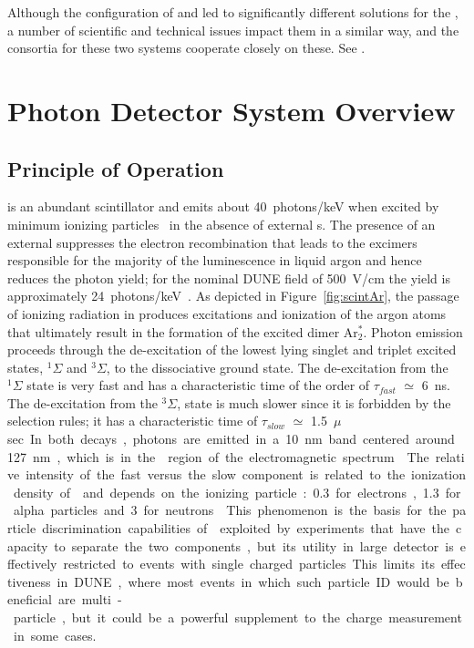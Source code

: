 Although the configuration of \single and \dual {} led to significantly different solutions for the , a number of scientific and technical issues impact them in a similar way, and the consortia for these two systems cooperate closely on these. See \dpchpds.



\section{Photon Detector System Overview}
\label{sec:fdsp-pd-overview}


\subsection{Principle of Operation}
\lar is  an abundant scintillator and emits about \SI{40}{photons/keV} when excited by minimum ionizing particles~\cite{Doke:1990rza} in the absence of external \efield{}s.
The presence of an external \efield{} suppresses the electron recombination that leads to the excimers responsible for the majority of the  luminescence in liquid argon and hence reduces the photon yield; for the nominal DUNE  field of \SI{500}{V/cm} the yield is approximately \SI{24}{photons/keV}~\cite{PhysRevB.20.3486}. 
As depicted in Figure~\ref{fig:scintAr}, the passage of ionizing radiation in \lar produces excitations and ionization of the argon atoms that ultimately result in the formation of the excited dimer Ar$^*_2$.  
Photon emission proceeds through the de-excitation of the lowest lying singlet and triplet excited states, $^{1}\Sigma$ and 
$^{3}\Sigma$, to the dissociative ground state. The de-excitation from the $^{1}\Sigma$ state is very fast and has a characteristic time of the order of $\tau_{fast}$ $\simeq$ \SI{6}{ns}. The de-excitation from the $^{3}\Sigma$, state is much slower since it is forbidden by the selection rules; it has a characteristic time of $\tau_{slow}$ $\simeq$ \SI{1.5}{$\mu$sec}. %
In both decays, photons are emitted in a \SI{10}{nm} band centered around \SI{127}{nm}, which is in the  region of the electromagnetic spectrum~\cite{Heindl:2010zz}.
The relative intensity of the  fast versus the slow component is related to the ionization density of \lar and depends on the ionizing particle: \num{0.3} for electrons, \num{1.3} for alpha particles and \num{3} for neutrons~\cite{PhysRevB.27.5279}. 
This phenomenon is the basis for the particle discrimination capabilities of \lar exploited by experiments that have the capacity to separate the two components, but its utility in large detector is effectively restricted to events with single charged particles. This %
limits its effectiveness in DUNE, where most events in which such particle ID would be beneficial are multi-particle, but it could be a powerful supplement to the charge measurement in some cases.

